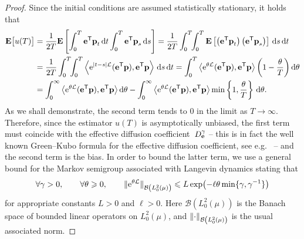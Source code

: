 \documentclass[11pt,a4paper]{article}
\begin{document}
\begin{proof}
Since the initial conditions are assumed statistically stationary,
it holds that
\begin{equation}
\label{eq:bias_without_control}
\begin{aligned}[b]
    \expect \bigl[u(T)\bigr]
    &= \frac{1}{2T} \expect \left[ \int_{0}^{T} \vect e^\t \vect p_{t} \, \d t \int_{0}^{T} \vect e^\t \vect p_s \, \d s \right]
    = \frac{1}{2T}  \int_{0}^{T} \!\! \int_{0}^{T} \expect \left[ \left(\vect e^\t \vect p_t\right) \left(\vect e^\t \vect p_s\right) \right] \, \d s \, \d t  \\
    &= \frac{1}{2T}  \int_{0}^{T} \!\! \int_{0}^{T} \ip{\e^{\abs{t - s} \mathcal L}(\vect e^\t \vect p)}{\vect e^\t \vect p} \, \d s \, \d t
    =  \int_{0}^{T} \ip{\e^{\theta \mathcal L} (\vect e^\t \vect p)}{\vect e^\t \vect p} \left(1 - \frac{\theta}{T}\right) \d \theta  \\
    &= \int_{0}^{\infty} \ip{\e^{\theta \mathcal L}(\vect e^\t \vect p)}{\vect e^\t \vect p}  \d \theta
    - \int_{0}^{\infty} \ip{\e^{\theta \mathcal L} (\vect e^\t \vect p)}{\vect e^\t \vect p} \min\left\{1, \frac{\theta}{T}\right\} \, \d \theta.
\end{aligned}
\end{equation}
As we shall demonstrate, the second term tends to 0 in the limit as $T \to \infty$.
Therefore, since the estimator $u(T)$ is asymptotically unbiased,
the first term must coincide with the effective diffusion coefficient~$D^{\gamma}_{\boldsymbol{\mathbf e}}$
-- this is in fact the well known Green--Kubo formula for the effective diffusion coefficient, see e.g.~\cite{pavliotis2011applied,MR3509213} --
and the second term is the bias.
In order to bound the latter term,
we use a general bound for the Markov semigroup associated with Langevin dynamics
stating that
\begin{equation}
    \label{eq:decay_semigroup_general}
    \forall \gamma > 0, \qquad \forall \theta \geq 0, \qquad
    \norm*{ \e^{\theta \mathcal L} }[\mathcal B \left(L^2_0\left(\mu\right) \right)] \leq L \exp \bigl(- \ell \theta \min\{\gamma, \gamma^{-1}\} \bigr)
\end{equation}
for appropriate constants $L > 0$ and $\ell > 0$.
Here $\mathcal B\left(L^2_0(\mu)\right)$ is the Banach space of bounded linear operators on $L^2_0(\mu)$,
and $\norm{\cdot}_{\mathcal B\left(L^2_0(\mu)\right)}$ is the usual associated norm.

\end{proof}
\end{document}

